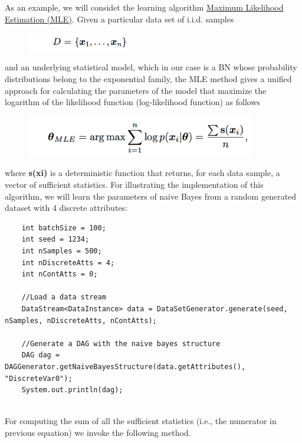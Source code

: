 \documentclass[10pt,a4paper]{article}
\begin{document}
As an example, we will considet the learning algorithm \href{http://docslide.us/documents/daphne-koller-parameter-estimation-maximum-likelihood-estimation-probabilistic.html}{Maximum Likelihood Estimation (MLE)}. Given a particular data set of i.i.d. samples

\begin{figure}[h!]
	\centering
	\includegraphics[width=4.5cm]{img/samples.png}
\end{figure}

\noindent and an underlying statistical model, which in our case is a BN whose probability distributions belong to the exponential family, the MLE method gives a unified approach for calculating the parameters of the model that maximize the logarithm of the likelihood function (log-likelihood function) as follows 

\begin{figure}[h!]
	\centering
	\includegraphics[width=10cm]{img/mle.png}
\end{figure}

\noindent where \textbf{s(xi)} is a deterministic function that returns, for each data sample, a vector of sufficient statistics. For illustrating the implementation of this algorithm, we will learn the parameters of naive Bayes from a random generated dataset with 4 discrete attributes:

\begin{lstlisting}
	int batchSize = 100;
	int seed = 1234;
	int nSamples = 500;
	int nDiscreteAtts = 4;
	int nContAtts = 0;
	
	//Load a data stream
	DataStream<DataInstance> data = DataSetGenerator.generate(seed, nSamples, nDiscreteAtts, nContAtts);
	
	//Generate a DAG with the naive bayes structure
	DAG dag = DAGGenerator.getNaiveBayesStructure(data.getAttributes(), "DiscreteVar0");
	System.out.println(dag);
	

\end{lstlisting}

For computing the sum of all the sufficient statistics (i.e., the numerator in previous equation) we invoke the following method.
\end{document}
